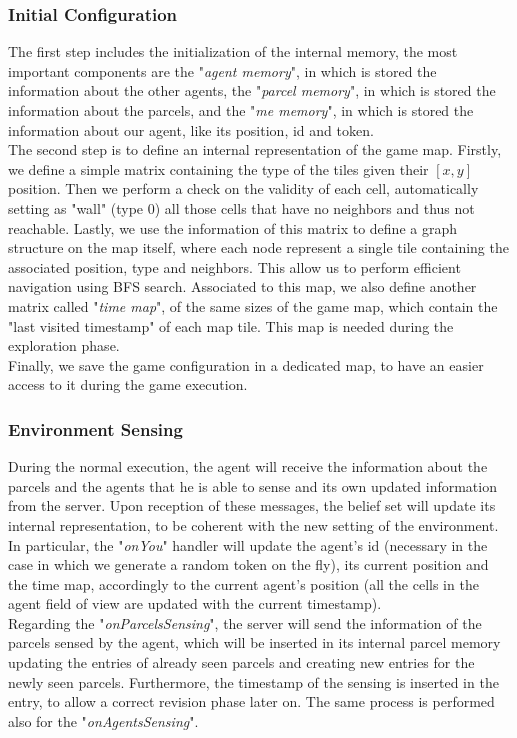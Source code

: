         \subsubsection{Initial Configuration}
            The first step includes the initialization of the internal memory, the most important components are the "\textit{agent memory}", in which is stored the information about the other agents, the "\textit{parcel memory}", in which is stored the information about the parcels, and the "\textit{me memory}", in which is stored the information about our agent, like its position, id and token.
            \medskip\\
            The second step is to define an internal representation of the game map. Firstly, we define a simple matrix containing the type of the tiles given their $[x, y]$ position. Then we perform a check on the validity of each cell, automatically setting as "wall" (type $0$) all those cells that have no neighbors and thus not reachable. Lastly, we use the information of this matrix to define a graph structure on the map itself, where each node represent a single tile containing the associated position, type and neighbors. This allow us to perform efficient navigation using BFS search. Associated to this map, we also define another matrix called "\textit{time map}", of the same sizes of the game map, which contain the "last visited timestamp" of each map tile. This map is needed during the exploration phase.
            \medskip\\
            Finally, we save the game configuration in a dedicated map, to have an easier access to it during the game execution.

        \subsubsection{Environment Sensing}
            During the normal execution, the agent will receive the information about the parcels and the agents that he is able to sense and its own updated information from the server. Upon reception of these messages, the belief set will update its internal representation, to be coherent with the new setting of the environment.  In particular, the "\textit{onYou}" handler will update the agent's id (necessary in the case in which we generate a random token on the fly), its current position and the time map, accordingly to the current agent's position (all the cells in the agent field of view are updated with the current timestamp).
            \medskip\\
            Regarding the "\textit{onParcelsSensing}", the server will send the information of the parcels sensed by the agent, which will be inserted in its internal parcel memory updating the entries of already seen parcels and creating new entries for the newly seen parcels. Furthermore, the timestamp of the sensing is inserted in the entry, to allow a correct revision phase later on. The same process is performed also for the "\textit{onAgentsSensing}".

